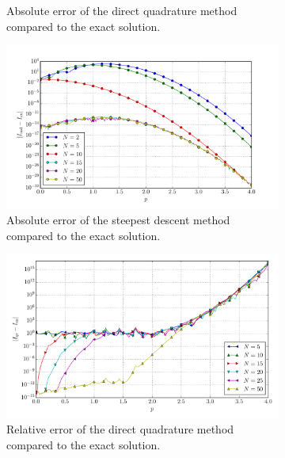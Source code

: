 \documentclass[a4paper,10pt]{article}
\begin{document}
\begin{figure}[ht!]
\begin{subfigure}[t]{0.5\linewidth}
    \caption{Absolute error of the direct quadrature method compared to the exact solution.}
    \label{fig:tp_1d_conv_p_11_9_err_qr}
  \end{subfigure}
  \begin{subfigure}[t]{0.5\linewidth}
    \includegraphics[width=\linewidth]{./plots/tp_1d_conv_p_11_9_err_nsd.pdf}
    \caption{Absolute error of the steepest descent method compared to the exact solution.}
    \label{fig:tp_1d_conv_p_11_9_err_nsd}
  \end{subfigure}
  \begin{subfigure}[t]{0.5\linewidth}
    \includegraphics[width=\linewidth]{./plots/tp_1d_conv_p_11_9_err_rel_qr.pdf}
    \caption{Relative error of the direct quadrature method compared to the exact solution.}
    \label{fig:tp_1d_conv_p_11_9_err_rel_qr}
  \end{subfigure}
  \begin{subfigure}[t]{0.5\linewidth}

\end{subfigure}
\end{figure}
\end{document}
